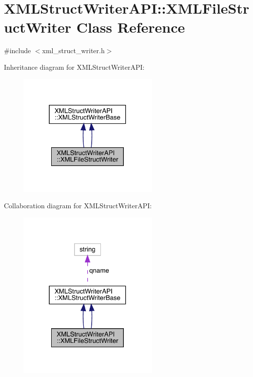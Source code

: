 \hypertarget{classXMLStructWriterAPI_1_1XMLFileStructWriter}{}\section{X\+M\+L\+Struct\+Writer\+A\+PI\+:\+:X\+M\+L\+File\+Struct\+Writer Class Reference}
\label{classXMLStructWriterAPI_1_1XMLFileStructWriter}


{\ttfamily \#include $<$xml\+\_\+struct\+\_\+writer.\+h$>$}



Inheritance diagram for X\+M\+L\+Struct\+Writer\+A\+PI\+:\nopagebreak
\begin{figure}[H]
\begin{center}
\leavevmode
\includegraphics[width=198pt]{de/d04/classXMLStructWriterAPI_1_1XMLFileStructWriter__inherit__graph}
\end{center}
\end{figure}


Collaboration diagram for X\+M\+L\+Struct\+Writer\+A\+PI\+:\nopagebreak
\begin{figure}[H]
\begin{center}
\leavevmode
\includegraphics[width=198pt]{d5/d3e/classXMLStructWriterAPI_1_1XMLFileStructWriter__coll__graph}
\end{center}
\end{figure}
